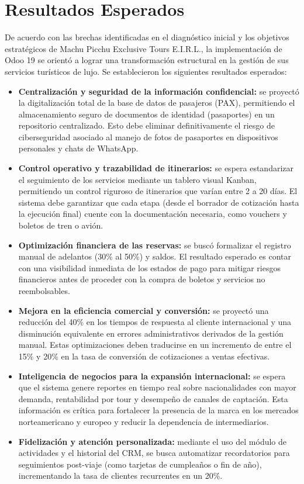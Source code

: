 \section{Resultados Esperados}

De acuerdo con las brechas identificadas en el diagnóstico inicial y los objetivos
estratégicos de Machu Picchu Exclusive Tours E.I.R.L., la implementación de Odoo 19 se
orientó a lograr una transformación estructural en la gestión de sus servicios turísticos
de lujo. Se establecieron los siguientes resultados esperados:

\begin{itemize}
    \item \textbf{Centralización y seguridad de la información confidencial:} se proyectó la digitalización total de la base de datos de pasajeros (PAX), permitiendo el almacenamiento seguro de documentos de identidad (pasaportes) en un repositorio centralizado. Esto debe eliminar definitivamente el riesgo de ciberseguridad asociado al manejo de fotos de pasaportes en dispositivos personales y chats de WhatsApp.
    \item \textbf{Control operativo y trazabilidad de itinerarios:} se espera estandarizar el seguimiento de los servicios mediante un tablero visual Kanban, permitiendo un control riguroso de itinerarios que varían entre 2 a 20 días. El sistema debe garantizar que cada etapa (desde el borrador de cotización hasta la ejecución final) cuente con la documentación necesaria, como vouchers y boletos de tren o avión.
    \item \textbf{Optimización financiera de las reservas:} se buscó formalizar el registro manual de adelantos (30\% al 50\%) y saldos. El resultado esperado es contar con una visibilidad inmediata de los estados de pago para mitigar riesgos financieros antes de proceder con la compra de boletos y servicios no reembolsables.
    \item \textbf{Mejora en la eficiencia comercial y conversión:} se proyectó una reducción del 40\% en los tiempos de respuesta al cliente internacional y una disminución equivalente en errores administrativos derivados de la gestión manual. Estas optimizaciones deben traducirse en un incremento de entre el 15\% y 20\% en la tasa de conversión de cotizaciones a ventas efectivas.
    \item \textbf{Inteligencia de negocios para la expansión internacional:} se espera que el sistema genere reportes en tiempo real sobre nacionalidades con mayor demanda, rentabilidad por tour y desempeño de canales de captación. Esta información es crítica para fortalecer la presencia de la marca en los mercados norteamericano y europeo y reducir la dependencia de intermediarios.
    \item \textbf{Fidelización y atención personalizada:} mediante el uso del módulo de actividades y el historial del CRM, se busca automatizar recordatorios para seguimientos post-viaje (como tarjetas de cumpleaños o fin de año), incrementando la tasa de clientes recurrentes en un 20\%.
\end{itemize}
